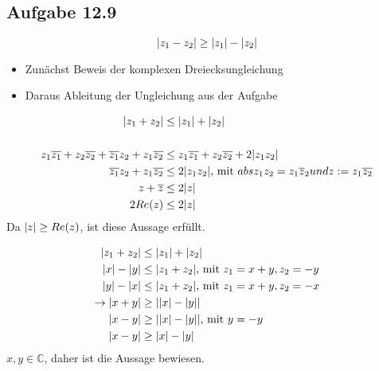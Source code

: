 \documentclass{standalone}
\begin{document}
\subsection{Aufgabe 12.9}

$$\lvert z_1 - z_2\rvert \geq \lvert z_1\rvert - \lvert z_2\rvert$$

\begin{itemize}
    \item Zunächst Beweis der komplexen Dreiecksungleichung
    \item Daraus Ableitung der Ungleichung aus der Aufgabe
\end{itemize}

\begin{align}
    \lvert z_1 + z_2\rvert &\leq \lvert z_1\rvert + \lvert z_2\rvert \\
    \\
    z_1 \overline{z_1} + z_2 \overline{z_2} + \overline{z_1} z_2 + z_1 \overline{z_2} &\leq z_1 \overline{z_1} + z_2 \overline{z_2} + 2 \lvert z_1 z_2\rvert \\
    \overline{z_1}z_2 + z_1 \overline{z_2} &\leq 2 \lvert z_1 z_2\rvert \text{, mit } abs{z_1 z_2} = z_1 \overline z_2 und z:=z_1\overline{z_2} \\
    z + \overline{z} &\leq 2 \lvert z\rvert \\
    2 Re(z) &\leq 2 \lvert z\rvert
\end{align}
Da $\lvert z\rvert \geq Re(z)$, ist diese Aussage erfüllt.

\begin{align}
    \lvert z_1 + z_2\rvert &\leq \lvert z_1\rvert + \lvert z_2\rvert \\
    \lvert x\rvert - \lvert y\rvert &\leq \lvert z_1 + z_2\rvert \text{, mit } z_1 = x+y, z_2 = -y \\
    \lvert y\rvert - \lvert x\rvert &\leq \lvert z_1 + z_2\rvert \text{, mit } z_1 = x+y, z_2 = -x \\
    \rightarrow \lvert x + y\rvert &\geq \lvert\lvert x\rvert - \lvert y\rvert\rvert \\
    \lvert x - y\rvert &\geq \lvert\lvert x\rvert - \lvert y\rvert\rvert \text{, mit } y = -y \\
    \lvert x - y\rvert &\geq \lvert x\rvert - \lvert y\rvert 
\end{align}
$x,y \in \mathbb{C}$, daher ist die Aussage bewiesen.
\end{document}

